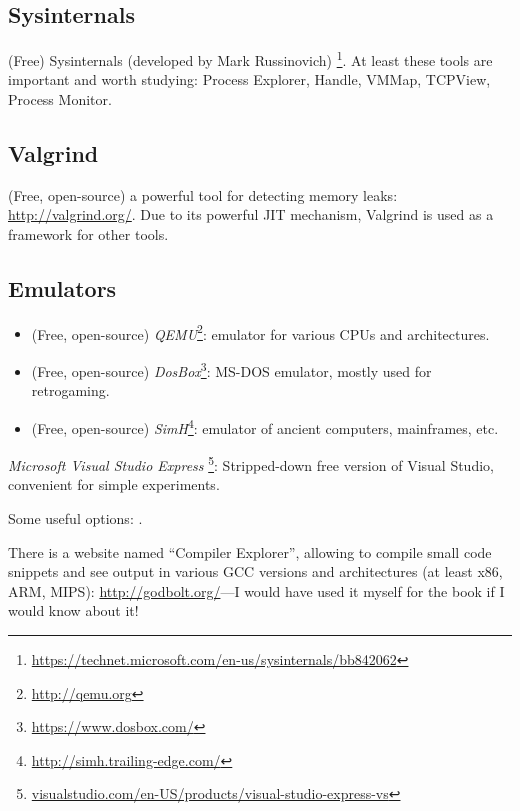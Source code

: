 \subsection{Sysinternals}

(Free) Sysinternals (developed by Mark Russinovich)
\footnote{\url{https://technet.microsoft.com/en-us/sysinternals/bb842062}}.
At least these tools are important and worth studying: Process Explorer, Handle, VMMap, TCPView, Process Monitor.

\subsection{Valgrind}

(Free, open-source) a powerful tool for detecting memory leaks: \url{http://valgrind.org/}.
Due to its powerful \ac{JIT} mechanism, Valgrind is used as a framework for other tools.


\subsection{Emulators}

\begin{itemize}
\item (Free, open-source) \emph{QEMU}\footnote{\url{http://qemu.org}}: emulator for various CPUs and architectures.

\item (Free, open-source) \emph{DosBox}\footnote{\url{https://www.dosbox.com/}}: MS-DOS emulator, mostly used for retrogaming.

\item (Free, open-source) \emph{SimH}\footnote{\url{http://simh.trailing-edge.com/}}: emulator of ancient computers, mainframes, etc.
\end{itemize}


\emph{Microsoft Visual Studio Express}
\footnote{\href{http://go.yurichev.com/17034}{visualstudio.com/en-US/products/visual-studio-express-vs}}:
Stripped-down free version of Visual Studio, convenient for simple experiments.

Some useful options: .

There is a website named ``Compiler Explorer'', allowing to compile small code snippets and see output
in various GCC versions and architectures
(at least x86, ARM, MIPS): \url{http://godbolt.org/}---I would have used it myself for the book if I would know about it!

